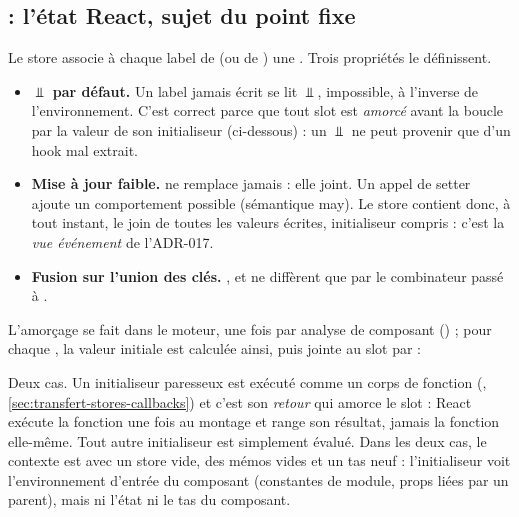\subsection{ : l'état React, sujet du point fixe}


Le store associe à chaque label de  (ou de )
une . Trois propriétés le définissent.

\begin{itemize}
  \item \textbf{$\Bot$ par défaut.} Un label jamais écrit se lit $\Bot$,
    \og impossible\fg{}, à l'inverse de l'environnement. C'est correct parce
    que tout slot est \emph{amorcé} avant la boucle par la valeur de son
    initialiseur (ci-dessous) : un $\Bot$ ne peut provenir que d'un hook mal
    extrait.
  \item \textbf{Mise à jour faible.}  ne remplace jamais : elle
    joint. Un appel de setter ajoute un comportement possible (sémantique
    may). Le store contient donc, à tout instant, le join de toutes les
    valeurs écrites, initialiseur compris : c'est la \emph{vue événement} de
    l'ADR-017.
  \item \textbf{Fusion sur l'union des clés.} ,  et
     ne diffèrent que par le combinateur passé à
    .
\end{itemize}

L'amorçage se fait dans le moteur, une fois par analyse de composant
() ; pour chaque ,
la valeur initiale est calculée ainsi, puis jointe au slot par
 :


Deux cas. Un initialiseur paresseux  est exécuté
comme un corps de fonction (, \cref{sec:transfert-stores-callbacks})
et c'est son \emph{retour} qui amorce le slot : React exécute la fonction une
fois au montage et range son résultat, jamais la fonction elle-même. Tout
autre initialiseur est simplement évalué. Dans les deux cas, le contexte est
 avec un store vide, des mémos vides et un tas neuf :
l'initialiseur voit l'environnement d'entrée du composant (constantes de
module, props liées par un parent), mais ni l'état ni le tas du composant.

